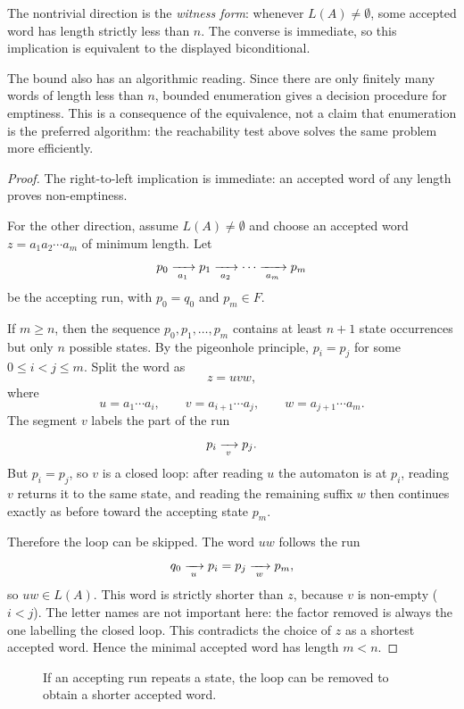 The nontrivial direction is the \emph{witness form}: whenever
$L(A)\neq\emptyset$, some accepted word has length strictly less than
$n$.  The converse is immediate, so this implication is equivalent to
the displayed biconditional.

The bound also has an algorithmic reading.  Since there are only
finitely many words of length less than $n$, bounded enumeration gives
a decision procedure for emptiness.  This is a consequence of the
equivalence, not a claim that enumeration is the preferred algorithm:
the reachability test above solves the same problem more efficiently.

\medskip
\begin{proof}
The right-to-left implication is immediate: an accepted word of any
length proves non-emptiness.

For the other direction, assume $L(A)\neq\emptyset$ and choose an
accepted word $z=a_1a_2\cdots a_m$ of minimum length.  Let
\[
  p_0 \xrightarrow[{\;a_1\;}]{} p_1
      \xrightarrow[{\;a_2\;}]{} \cdots
      \xrightarrow[{\;a_m\;}]{} p_m
\]
be the accepting run, with $p_0=q_0$ and $p_m\in F$.

If $m\geq n$, then the sequence $p_0,p_1,\ldots,p_m$ contains at least
$n+1$ state occurrences but only $n$ possible states.  By the pigeonhole
principle, $p_i=p_j$ for some $0\leq i<j\leq m$.  Split the word as
\[
  z = u v w,
\]
where
\[
  u=a_1\cdots a_i,\qquad
  v=a_{i+1}\cdots a_j,\qquad
  w=a_{j+1}\cdots a_m.
\]
The segment $v$ labels the part of the run
\[
  p_i \xrightarrow[{\;v\;}]{} p_j.
\]
But $p_i=p_j$, so $v$ is a closed loop: after reading $u$ the automaton
is at $p_i$, reading $v$ returns it to the same state, and reading the
remaining suffix $w$ then continues exactly as before toward the
accepting state $p_m$.

Therefore the loop can be skipped.  The word $uw$ follows the run
\[
  q_0 \xrightarrow[{\;u\;}]{} p_i
      = p_j \xrightarrow[{\;w\;}]{} p_m,
\]
so $uw\in L(A)$.  This word is strictly shorter than $z$, because
$v$ is non-empty ($i<j$).  The letter names are not important here: the
factor removed is always the one labelling the closed loop.  This
contradicts the choice of $z$ as a shortest accepted word.  Hence the
minimal accepted word has length $m<n$.
\end{proof}

\begin{figure}[ht]
\centering
{}
\caption{If an accepting run repeats a state, the loop can be removed to obtain a shorter accepted word.}
\label{fig:small-model-loop-removal}
\end{figure}

